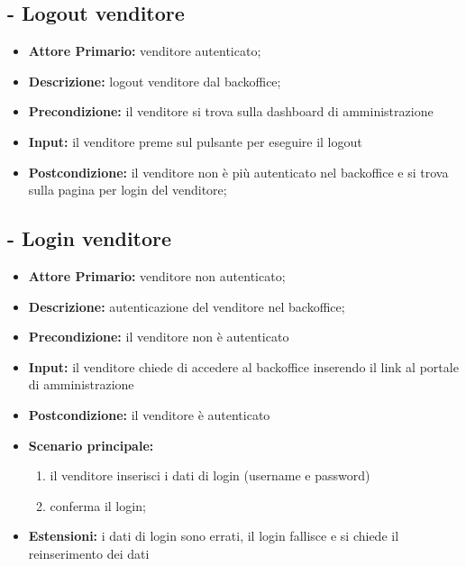\stepUserCase
\subsection{ - Logout venditore}
\begin{itemize}
    \item \textbf{Attore Primario:} venditore autenticato;
    \item \textbf{Descrizione:} logout venditore dal backoffice;
    \item \textbf{Precondizione:} il venditore si trova sulla dashboard di amministrazione
    \item \textbf{Input:} il venditore preme sul pulsante per eseguire il logout
    \item \textbf{Postcondizione:} il venditore non è più autenticato nel backoffice e si trova sulla pagina per login del venditore;
\end{itemize}

\stepUserCase
\subsection{ - Login venditore}
\begin{itemize}
    \item \textbf{Attore Primario:} venditore non autenticato;
    \item \textbf{Descrizione:} autenticazione del venditore nel backoffice;
    \item \textbf{Precondizione:} il venditore non è autenticato
    \item \textbf{Input:} il venditore chiede di accedere al backoffice inserendo il link al portale di amministrazione
    \item \textbf{Postcondizione:} il venditore è autenticato
    \item \textbf{Scenario principale:}
    \begin{enumerate}
        \item il venditore inserisci i dati di login (username e password)
        \item conferma il login;
    \end{enumerate}
    \item \textbf{Estensioni:} i dati di login sono errati, il login fallisce e si chiede il reinserimento dei dati
\end{itemize}